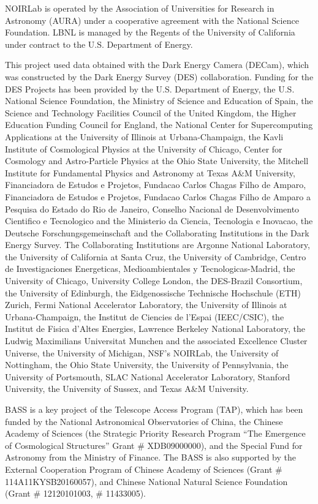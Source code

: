 \documentclass[twocolumn]{aastex631}
\begin{document}
NOIRLab is operated by the Association of Universities for Research in Astronomy (AURA) under a cooperative agreement with the National Science Foundation. LBNL is managed by the Regents of the University of California under contract to the U.S. Department of Energy.

This project used data obtained with the Dark Energy Camera (DECam), which was constructed by the Dark Energy Survey (DES) collaboration. Funding for the DES Projects has been provided by the U.S. Department of Energy, the U.S. National Science Foundation, the Ministry of Science and Education of Spain, the Science and Technology Facilities Council of the United Kingdom, the Higher Education Funding Council for England, the National Center for Supercomputing Applications at the University of Illinois at Urbana-Champaign, the Kavli Institute of Cosmological Physics at the University of Chicago, Center for Cosmology and Astro-Particle Physics at the Ohio State University, the Mitchell Institute for Fundamental Physics and Astronomy at Texas A\&M University, Financiadora de Estudos e Projetos, Fundacao Carlos Chagas Filho de Amparo, Financiadora de Estudos e Projetos, Fundacao Carlos Chagas Filho de Amparo a Pesquisa do Estado do Rio de Janeiro, Conselho Nacional de Desenvolvimento Cientifico e Tecnologico and the Ministerio da Ciencia, Tecnologia e Inovacao, the Deutsche Forschungsgemeinschaft and the Collaborating Institutions in the Dark Energy Survey. The Collaborating Institutions are Argonne National Laboratory, the University of California at Santa Cruz, the University of Cambridge, Centro de Investigaciones Energeticas, Medioambientales y Tecnologicas-Madrid, the University of Chicago, University College London, the DES-Brazil Consortium, the University of Edinburgh, the Eidgenossische Technische Hochschule (ETH) Zurich, Fermi National Accelerator Laboratory, the University of Illinois at Urbana-Champaign, the Institut de Ciencies de l’Espai (IEEC/CSIC), the Institut de Fisica d’Altes Energies, Lawrence Berkeley National Laboratory, the Ludwig Maximilians Universitat Munchen and the associated Excellence Cluster Universe, the University of Michigan, NSF’s NOIRLab, the University of Nottingham, the Ohio State University, the University of Pennsylvania, the University of Portsmouth, SLAC National Accelerator Laboratory, Stanford University, the University of Sussex, and Texas A\&M University.

BASS is a key project of the Telescope Access Program (TAP), which has been funded by the National Astronomical Observatories of China, the Chinese Academy of Sciences (the Strategic Priority Research Program “The Emergence of Cosmological Structures” Grant \# XDB09000000), and the Special Fund for Astronomy from the Ministry of Finance. The BASS is also supported by the External Cooperation Program of Chinese Academy of Sciences (Grant \# 114A11KYSB20160057), and Chinese National Natural Science Foundation (Grant \# 12120101003, \# 11433005).
\end{document}
